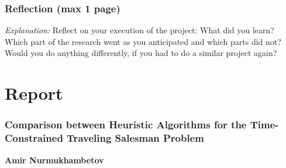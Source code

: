\documentclass[report,english,cleveref,autoref,a4paper]{lipics-v2021}
\newcommand{\myname}{Amir Nurmukhambetov}             %
\newcommand{\explanation}[1]{\emph{Explanation:} #1}
\newcommand{\explanation}[1]{}
\begin{document}
\section{Reflection (max 1 page)}
\explanation{Reflect on your execution of the project: What did you learn? 
Which part of the research went as you anticipated and which parts did not?
Would you do anything differently, if you had to do a similar project again?}





\newpage


\part{Report}
\label{part:report}
\newpage

\setcounter{section}{0}
\setcounter{page}{1}
\thispagestyle{empty}
\section*{Comparison between Heuristic Algorithms for the Time-Constrained Traveling Salesman Problem}
\textbf{\myname}

\linenumbers
\end{document}
